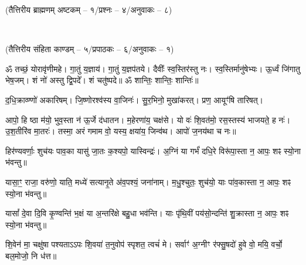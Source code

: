 
\vspace{-1ex}
\centerline{\normalsize(तैत्तिरीय ब्राह्मणम् अष्टकम् -- १/प्रश्नः -- ४/अनुवाकः -- ८)}\mbox{}\\[-2em]
\centerline{\normalsize(तैत्तिरीय संहिता काण्डम् -- ५/प्रपाठकः -- ६/अनुवाकः -- १)}


ॐ तच्छं॒ योरावृ॑णीमहे। गा॒तुं य॒ज्ञाय॑। गा॒तुं य॒ज्ञप॑तये। दैवीः᳚ स्व॒स्तिर॑स्तु नः।
स्व॒स्तिर्मानु॑षेभ्यः। ऊ॒र्ध्वं जि॑गातु भेष॒जम्। शं नो॑ अस्तु द्वि॒पदे᳚। शं चतु॑ष्पदे॥
ॐ शान्तिः॒ शान्तिः॒ शान्तिः॑॥

द॒धि॒क्राव्ण्णो॑ अकारिषम्। जि॒ष्णोरश्व॑स्य वा॒जिनः॑।
सु॒र॒भिनो॒ मुखा॑करत्। प्रण॒ आयूꣳ॑षि तारिषत्।

आपो॒ हि ष्ठा म॑यो॒ भुव॒स्ता न॑ ऊ॒र्जे द॑धातन।
म॒हेरणा॑य॒ चक्ष॑से। यो वः॑ शि॒वत॑मो॒ रस॒स्तस्य॑ भाजयते॒ ह नः॑।
उ॒श॒तीरि॑व मा॒तरः॑। तस्मा॒ अरं गमाम वो॒ यस्य॒ क्षया॑य॒ जिन्व॑थ।
आपो॑ ज॒नय॑था च नः॥

हिर॑ण्यवर्णाः॒ शुच॑यः पाव॒का यासु॑ जा॒तः क॒श्यपो॒ यास्विन्द्रः॑।
अ॒ग्निं या गर्भं॑ दधि॒रे विरू॑पा॒स्ता न॒ आपः॒ शꣴ स्यो॒ना भ॑वन्तु॥

यासा॒ꣳ॒ राजा॒ वरु॑णो॒ याति॒ मध्ये॑ सत्यानृ॒ते अ॑व॒पश्यं॒ जना॑नाम्।
म॒धु॒श्चुतः॒ शुच॑यो॒ याः पा॑व॒कास्ता न॒ आपः॒ शꣴ स्यो॒ना भ॑वन्तु॥

यासां᳚ दे॒वा दि॒वि कृ॒ण्वन्ति॑ भ॒क्षं या अ॒न्तरि॑क्षे बहु॒धा भव॑न्ति।
याः पृ॑थि॒वीं पय॑सो॒न्दन्ति॑ शु॒क्रास्ता न॒ आपः॒ शꣴ स्यो॒ना भ॑वन्तु॥

शि॒वेन॑ मा॒ चक्षु॑षा पश्यताऽऽपः शि॒वया॑ त॒नुवोप॑ स्पृशत॒ त्वचं॑ मे।
सर्वाꣳ॑ अ॒ग्नीꣳ र॑फ्सु॒षदो॑ हुवे वो॒ मयि॒ वर्चो॒ बल॒मोजो॒ नि ध॑त्त॥

